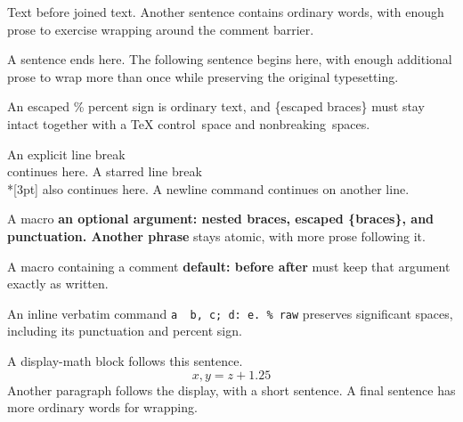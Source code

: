\documentclass{article}
\newcommand{\wrapped}[2][default]{\textbf{#1: #2}}
\begin{document}
Text before%
joined text. Another sentence contains ordinary words, with enough prose to exercise wrapping around the comment barrier.

A sentence ends here. %
The following sentence begins here, with enough additional prose to wrap more than once while preserving the original typesetting.

An escaped \% percent sign is ordinary text, and \{escaped braces\} must stay intact together with a TeX control\ space and nonbreaking~spaces.

An explicit line break\\
continues here. A starred line break\\*[3pt]
also continues here. A newline command\newline
continues on another line.

A macro \wrapped[an {optional} argument]{nested {braces}, escaped \{braces\}, and punctuation. Another phrase} stays atomic, with more prose following it.

A macro containing a comment \wrapped{before%
after} must keep that argument exactly as written.

An inline verbatim command \verb|a  b, c; d: e. % raw| preserves significant spaces, including its punctuation and percent sign.

A display-math block follows this sentence.
\[ x, y = z + 1.25 \]
Another paragraph follows the display, with a short sentence. A final sentence has more ordinary words for wrapping.
\end{document}
